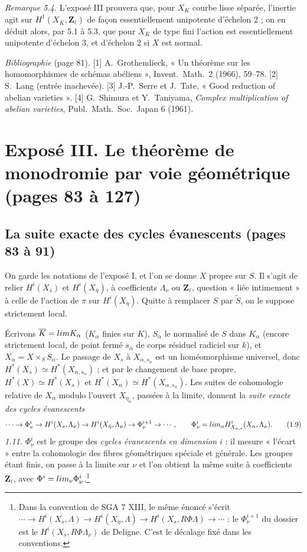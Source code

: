 \documentclass[11pt,a4paper]{article}
\begin{document}
\emph{Remarque 5.4.} L'exposé III prouvera que, pour $X_K$ courbe lisse séparée,
l'inertie agit sur $H^1(X_{\overline K}, \mathbf{Z}_\ell)$ de façon
essentiellement unipotente d'échelon $2$ ; on en déduit alors, par 5.1 à 5.3,
que pour $X_K$ de type fini l'action est essentiellement unipotente d'échelon
$3$, et d'échelon $2$ si $X$ est normal.

\emph{Bibliographie} (page 81). [1] A.\ Grothendieck, « Un théorème sur les
homomorphismes de schémas abéliens », Invent.\ Math.\ 2 (1966), 59--78. [2]
S.\ Lang (entrée inachevée). [3] J.-P.\ Serre et J.\ Tate, « Good reduction of
abelian varieties ». [4] G.\ Shimura et Y.\ Taniyama, \emph{Complex
multiplication of abelian varieties}, Publ.\ Math.\ Soc.\ Japan 6 (1961).

\section*{Exposé III. Le théorème de monodromie par voie géométrique (pages 83 à 127)}

\subsection*{La suite exacte des cycles évanescents (pages 83 à 91)}

On garde les notations de l'exposé I, et l'on se donne $X$ propre sur $S$. Il
s'agit de relier $H^i(X_{\bar s})$ et $H^i(X_{\bar\eta})$, à coefficients
$\Lambda_\nu$ ou $\mathbf{Z}_\ell$, question « liée intimement » à celle de
l'action de $\pi$ sur $H^i(X_{\bar\eta})$. Quitte à remplacer $S$ par
$\widetilde S$, on le suppose strictement local.

Écrivons $\overline K = \varinjlim K_\alpha$ ($K_\alpha$ finies sur $K$), $S_\alpha$
le normalisé de $S$ dans $K_\alpha$ (encore strictement local, de point fermé
$s_\alpha$ de corps résiduel radiciel sur $k$), et $X_\alpha = X \times_S
S_\alpha$. Le passage de $X_s$ à $X_{\alpha, s_\alpha}$ est un homéomorphisme
universel, donc $H^*(X_s) \simeq H^*(X_{\alpha,s_\alpha})$ ; et par le changement
de base propre, $H^*(X) \simeq H^*(X_s)$ et $H^*(X_\alpha) \simeq
H^*(X_{\alpha,s_\alpha})$. Les suites de cohomologie relative de $X_\alpha$
modulo l'ouvert $X_{\eta_\alpha}$, passées à la limite, donnent la \emph{suite
exacte des cycles évanescents}
\[
  \cdots \to \Phi^i_\nu \to H^i(X_s, \Lambda_\nu) \to H^i(X_{\bar\eta}, \Lambda_\nu)
  \to \Phi^{i+1}_\nu \to \cdots, \qquad
  \Phi^i_\nu = \varinjlim_\alpha H^i_{X_{\alpha,s}}(X_\alpha, \Lambda_\nu) .
  \tag{1.9}
\]
\emph{1.11.} $\Phi^i_\nu$ est le groupe des \emph{cycles évanescents en dimension
$i$} : il mesure « l'écart » entre la cohomologie des fibres géométriques
spéciale et générale. Les groupes étant finis, on passe à la limite sur $\nu$
et l'on obtient la même suite à coefficients $\mathbf{Z}_\ell$, avec $\Phi^i =
\varprojlim_\nu \Phi^i_\nu$.\footnote{Dans la convention de SGA 7 XIII, le
même énoncé s'écrit $\cdots \to H^i(X_s, \Lambda) \to H^i(X_{\bar\eta},\Lambda)
\to H^i(X_s, R\Phi\Lambda) \to \cdots$ : le $\Phi^{i+1}_\nu$ du dossier est le
$H^i(X_s, R\Phi\Lambda_\nu)$ de Deligne. C'est le décalage fixé dans les
conventions.}
\end{document}
